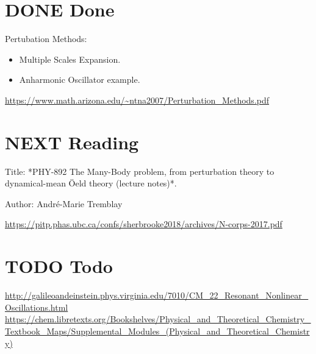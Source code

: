 \documentclass[11pt]{article}
\date{\today}
\title{}
\begin{document}
\tableofcontents

\section{{\bfseries\sffamily DONE} Done}
\label{sec:org158c9dc}
Pertubation Methods:
\begin{itemize}
\item Multiple Scales Expansion.
\item Anharmonic Oscillator example.
\end{itemize}
\url{https://www.math.arizona.edu/\~ntna2007/Perturbation\_Methods.pdf}

\section{{\bfseries\sffamily NEXT} Reading}
\label{sec:org7383952}
Title: *PHY-892 The Many-Body problem, from
perturbation theory to dynamical-mean Öeld
theory (lecture notes)*.

Author: André-Marie Tremblay

\url{https://pitp.phas.ubc.ca/confs/sherbrooke2018/archives/N-corps-2017.pdf}

\section{{\bfseries\sffamily TODO} Todo}
\label{sec:org12aab9d}
\url{http://galileoandeinstein.phys.virginia.edu/7010/CM\_22\_Resonant\_Nonlinear\_Oscillations.html}
\url{https://chem.libretexts.org/Bookshelves/Physical\_and\_Theoretical\_Chemistry\_Textbook\_Maps/Supplemental\_Modules\_(Physical\_and\_Theoretical\_Chemistry)}
\end{document}

